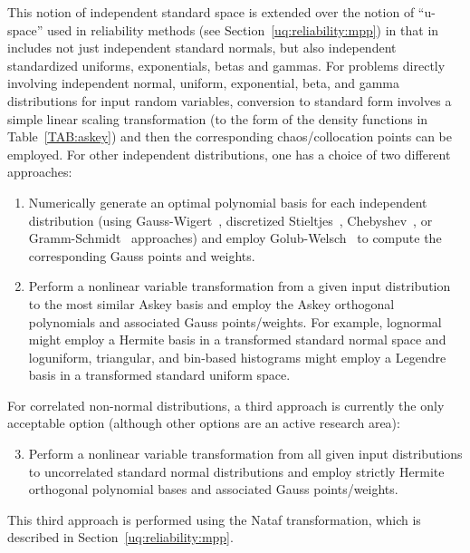 This notion of independent standard space is extended over the notion
of ``u-space'' used in reliability methods (see
Section~\ref{uq:reliability:mpp}) in that in includes not just
independent standard normals, but also independent standardized
uniforms, exponentials, betas and gammas.  For problems directly
involving independent normal, uniform, exponential, beta, and gamma
distributions for input random variables, conversion to standard form
involves a simple linear scaling transformation (to the form of the
density functions in Table~\ref{TAB:askey}) and then the corresponding
chaos/collocation points can be employed.
For other independent distributions, one has a choice of two
different approaches:
\begin{enumerate}
\item Numerically generate an optimal polynomial basis for each 
independent distribution (using Gauss-Wigert~\cite{simpson_gw},
discretized Stieltjes~\cite{gautschi_book},
Chebyshev~\cite{gautschi_book}, or Gramm-Schmidt~\cite{WillBijl06}
approaches) and employ Golub-Welsch~\cite{GolubWelsch69} to compute
the corresponding Gauss points and weights.
\item Perform a nonlinear variable transformation from a given
input distribution to the most similar Askey basis and employ the
Askey orthogonal polynomials and associated Gauss points/weights.
For example, lognormal might employ a Hermite basis in a transformed
standard normal space and loguniform, triangular, and bin-based 
histograms might employ a Legendre basis in a transformed standard 
uniform space.
\end{enumerate}
For correlated non-normal distributions, a third approach is currently
the only acceptable option (although other options are an active
research area):
\begin{enumerate}
\setcounter{enumi}{2}
\item Perform a nonlinear variable transformation from all given
input distributions to uncorrelated standard normal distributions and
employ strictly Hermite orthogonal polynomial bases and associated
Gauss points/weights.
\end{enumerate}
This third approach is performed using the Nataf transformation, which
is described in Section~\ref{uq:reliability:mpp}.

